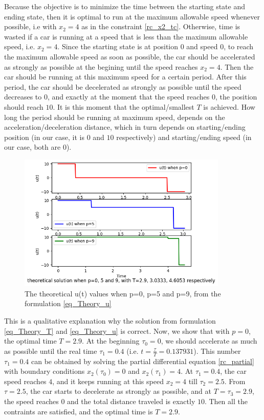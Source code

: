 \documentclass  [
  paper    = a4,
  BCOR     = 10mm,
  twoside,
  fontsize = 12pt,
  fleqn,
  toc      = bibnumbered,
  toc      = listofnumbered,
  numbers  = noendperiod,
  headings = normal,
  listof   = leveldown,
  version  = 3.03
]                                       {scrreprt}
\newcommand{\<}{\langle}
\renewcommand{\>}{\rangle}
\begin{document}
Because the objective is to minimize the time between the starting state and ending state, then it is optimal to run at the maximum allowable speed whenever possible, i.e with $x_2 =4$ as in the constraint \ref{rc_x2_tc}. Otherwise, time is wasted if a car is running at a speed that is less than the maximum allowable speed, i.e. $x_2=4$. Since the starting state is at position $0$ and speed $0$, to reach the maximum allowable speed as soon as possible, the car should be accelerated as strongly as possible at the begining until the speed reaches $x_2 =4$. Then the car should be running at this maximum speed for a certain period. After this period, the car should be decelerated as strongly as possible until the speed decreases to $0$, and exactly at the moment that the speed reaches $0$, the position should reach $10$. It is this moment that the optimal/smallest $T$ is achieved. How long the period should be running at maximum speed, depends on the acceleration/deceleration distance, which in turn depends on  starting/ending position (in our case, it is $0$ and $10$ respectively) and starting/ending speed (in our case, both are $0$). 

\begin{figure}[h]
	\centerline{\includegraphics[width=10cm]{theory_ut_3p.png}}
	\caption{The theoretical u(t) values when p=0, p=5 and p=9, from the formulation \ref{eq_Theory_u}}
	\label{theory_ut_3p}
\end{figure}

This is a qualitative explanation why the solution from formulation \ref{eq_Theory_T} and \ref{eq_Theory_u} is correct. Now, we show that with $p=0$, the optimal time $T=2.9$. At the beginning $\tau_0 = 0$,  we should accelerate as much as possible until the real time $\tau_1=0.4$ (i.e. $t= \frac{\tau}{T} = 0.137931$). This number $\tau_1=0.4$ can be obtained by solving the partial differential equation \ref{rc_partial} with boundary conditions $x_2(\tau_0)=0$ and $x_2(\tau_1)=4$. At $\tau_1=0.4$, the car speed reaches $4$, and it keeps running at this speed $x_2=4$ till $\tau_2=2.5$. From $\tau=2.5$, the car starts to decelerate as strongly as possible, and at $T=\tau_3=2.9$, the speed reaches $0$ and the total distance traveled is exactly $10$. Then all the contraints are satisfied, and the optimal time is $T=2.9$. 
\end{document}
